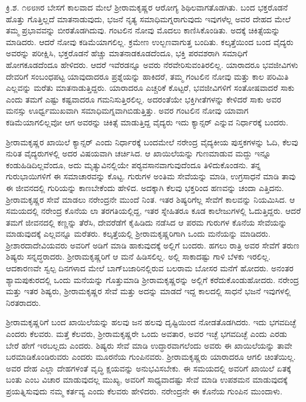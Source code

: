 ಕ್ರಿ.ಶ. ೧೮೮೫ರ ಬೇಸಗೆ ಕಾಲವಾದ ಮೇಲೆ ಶ‍್ರೀರಾಮಕೃಷ್ಣರ ಆರೋಗ್ಯ ಶಿಥಿಲವಾಗತೊಡಗಿತು. ಬಂದ ಭಕ್ತರೊಡನೆ ಹೊತ್ತು ಗೊತ್ತಿಲ್ಲದೆ ಮಾತನಾಡುವುದು, ಭಜನೆ ನೃತ್ಯ ಸಮಾಧಿಮಗ್ನರಾಗುವುದು ಇವುಗಳೆಲ್ಲ ಅವರ ದೇಹದ ಮೇಲೆ ತಮ್ಮ ಪ್ರಭಾವವನ್ನು ಬೀರತೊಡಗಿದುವು. ಗಂಟಲಿನ ನೋವು ಮೊದಲು ಕಾಣಿಸಿಕೊಂಡಿತು. ಅದಕ್ಕೆ ಚಿಕಿತ್ಸೆಯನ್ನು ಮಾಡಿದರು. ಆದರೆ ನೋವು ಕಡಿಮೆಯಾಗಲಿಲ್ಲ. ಕ್ರಮೇಣ ಉಲ್ಬಣವಾಗುತ್ತ ಬಂದಿತು. ಕಲ್ಕತ್ತೆಯಿಂದ ಬಂದ ವೈದ್ಯರು ಅವರನ್ನು ಪರೀಕ್ಷಿಸಿ, ಭಕ್ತರೊಡನೆ ಹೆಚ್ಚು ಮಾತನಾಡಕೂಡದೆಂದೂ, ಭಕ್ತಿ ಪರವಶರಾಗಿ ಸಮಾಧಿಗೆ ಹೋಗಕೂಡದೆಂದೂ ಹೇಳಿದರು. ಆದರೆ ಇವೆರಡನ್ನೂ ಅವರು ನೆರವೇರಿಸುವಂತಿರಲಿಲ್ಲ. ಯಾರಾದರೂ ಭವಜೀವಿಗಳು ದೇವರಿಗೆ ಸಂಬಂಧಪಟ್ಟ ಯಾವುದಾದರೂ ಪ್ರಶ್ನೆಯನ್ನು ಹಾಕಿದರೆ, ತಮ್ಮ ಗಂಟಲಿನ ನೋವು ಮತ್ತು ಕಾಲ ಪರಿಮಿತಿ ಎಲ್ಲವನ್ನು ಮರೆತು ಮಾತನಾಡುತ್ತಿದ್ದರು. ಯಾರಾದರೂ ಎಚ್ಚರಿಕೆ ಕೊಟ್ಟರೆ, ಭವಜೀವಿಗಳಿಗೆ ಸಂತೋಷವಾದರೆ ಸಾಕು ಎಂದು ತಮಗೆ ಎಷ್ಟು ಕಷ್ಟವಾದರೂ ಗಮನಿಸುತ್ತಿರಲಿಲ್ಲ. ಅದರಂತೆಯೇ ಭಕ್ತಿಗೀತೆಗಳನ್ನು ಕೇಳಿದರೆ ಸಾಕು ಅವರ ಮನಸ್ಸು ಊರ್ಧ್ವಮುಖವಾಗಿ ಸಮಾಧಿಮಗ್ನವಾಗಿಬಿಡುತ್ತಿತ್ತು. ಅವರ ಗಂಟಲಿನ ನೋವು ಯಾವಾಗ ಕಡಿಮೆಯಾಗಲಿಲ್ಲವೋ ಆಗ ಅವರನ್ನು ಚಿಕಿತ್ಸೆ ಮಾಡುತ್ತಿದ್ದ ವೈದ್ಯರು ಇದು ಕ್ಯಾನ್ಸರ್ ಎನ್ನುವ ನಿರ್ಧಾರಕ್ಕೆ ಬಂದರು.

ಶ‍್ರೀರಾಮಕೃಷ್ಣರ ಖಾಯಿಲೆ ಕ್ಯಾನ್ಸರ್ ಎಂದು ನಿರ್ಧಾರಕ್ಕೆ ಬಂದಮೇಲೆ ನರೇಂದ್ರ ವೈದ್ಯಕೀಯ ಪುಸ್ತಕಗಳನ್ನು ಓದಿ, ಕೆಲವು ನುರಿತ ವೈದ್ಯರುಗಳಲ್ಲಿ ಅದರ ವಿಷಯವಾಗಿ ಚರ್ಚಿಸಿದ. ಆ ಖಾಯಿಲೆಯನ್ನು ಗುಣಮಾಡುವ ಮದ್ದು ಇನ್ನೂ ಕಂಡುಹಿಡಿದಿಲ್ಲವೆಂದೂ, ಅದು ಮೃತ್ಯುವಿನಲ್ಲಿಯೇ ಪರ‍್ಯವಸಾನವಾಗುವುದೆಂದೂ ತಿಳಿದುಕೊಂಡನು. ತನ್ನ ಗುರುಭಾಯಿಗಳಿಗೆ ಈ ಸಮಾಚಾರವನ್ನು ಕೊಟ್ಟ. ಗುರುಗಳ ಅಂತಿಮ ಸೇವೆಯನ್ನು ಮಾಡಿ, ಉಗ್ರಸಾಧನೆ ಮಾಡಿ ತಾವು ಈ ಜೀವನದಲ್ಲಿ ಗುರಿಯನ್ನು ಕಾಣಬೇಕೆಂದು ಹೇಳಿದ. ಅದಕ್ಕಾಗಿ ಕೆಲವು ಭಕ್ತರಿಂದ ಹಣವನ್ನು ಚಂದಾ ಎತ್ತಿದನು. ಶ‍್ರೀರಾಮಕೃಷ್ಣರ ಸೇವೆ ಮಾಡಲು ನರೇಂದ್ರನೇ ಮುಂದೆ ನಿಂತ. ಇತರ ಶಿಷ್ಯರಿಗೆಲ್ಲ ಸೇವೆಗೆ ಕಾಲವನ್ನು ನಿಯಮಿಸಿದ. ಆ ಸಮಯದಲ್ಲಿ ನರೇಂದ್ರ ಕೊನೆಯ ಲಾ ತರಗತಿಯಲ್ಲಿದ್ದ, ಇತರ ಸ್ನೇಹಿತರೂ ಕೂಡ ಕಾಲೇಜುಗಳಲ್ಲಿ ಓದುತ್ತಿದ್ದರು. ಆದರೆ ತಮಗೆ ಜೀವನದಲ್ಲಿ ಕಣ್ಣನ್ನು ತೆರೆಸಿ, ದೇವರೆಡೆಗೆ ಕೈಹಿಡಿದು ನಡೆಸಿದ ಆ ಪರಮ ಗುರುಗಳ ಕೊನೆಯ ಸೇವೆಯನ್ನು ಮಾಡುವುದಕ್ಕೆ ಎಲ್ಲವನ್ನೂ ಮರೆತರು. ಕಲ್ಕತ್ತೆಯಲ್ಲಿ ಶ‍್ರೀರಾಮಕೃಷ್ಣರಿಗಾಗಿ ಒಂದು ಮನೆಯನ್ನು ಮಾಡಿದರು. ಶ‍್ರೀಶಾರದಾದೇವಿಯವರು ಅವರಿಗೆ ಅಡಿಗೆ ಮಾಡಿ ಹಾಕುವುದಕ್ಕೆ ಅಲ್ಲಿಗೆ ಬಂದರು. ಹಗಲು ರಾತ್ರಿ ಅವರ ಸೇವೆಗೆ ತರುಣ ಶಿಷ್ಯರು ಸನ್ನದ್ಧರಾದರು. ಶ‍್ರೀರಾಮಕೃಷ್ಣರಿಗೆ ಆ ಮನೆ ಹಿಡಿಸಲಿಲ್ಲ. ಅಲ್ಲಿ ಸಾಕಾದಷ್ಟು ಗಾಳಿ ಬೆಳಕು ಇರಲಿಲ್ಲ. ಆದಕಾರಣವೇ ಸ್ವಲ್ಪ ದಿನಗಳಾದ ಮೇಲೆ ಬಾಗ್‍ಬಜಾರಿನಲ್ಲಿರುವ ಬಲರಾಮ ಬೋಸರ ಮನೆಗೆ ಹೋದರು. ಅನಂತರ ಶ್ಯಾಮಪುಕುರದಲ್ಲಿ ಒಂದು ಮನೆಯನ್ನು ಗೊತ್ತುಮಾಡಿ ಶ‍್ರೀರಾಮಕೃಷ್ಣರನ್ನು ಅಲ್ಲಿಗೆ ಕರೆದುಕೊಂಡುಹೋದರು. ನರೇಂದ್ರ ಮತ್ತು ಇತರ ಶಿಷ್ಯರು, ಶ‍್ರೀರಾಮಕೃಷ್ಣರ ಸೇವೆ ಮತ್ತು ಅದನ್ನು ಮಾಡದೆ ಇದ್ದ ಕಾಲದಲ್ಲಿ ಸಾಧನೆ ಭಜನೆ ಇವುಗಳಲ್ಲಿ ನಿರತರಾದರು.

ಶ‍್ರೀರಾಮಕೃಷ್ಣರಿಗೆ ಬಂದ ಖಾಯಿಲೆಯನ್ನು ಹಲವು ಜನ ಹಲವು ದೃಷ್ಟಿಯಿಂದ ನೋಡತೊಡಗಿದರು. ಇದು ಭಗವದಿಚ್ಛೆ ಎಂದರು ಕೆಲವರು. ಮತ್ತೆ ಕೆಲವರು, ಶ‍್ರೀರಾಮಕೃಷ್ಣರೇ ಒಂದು ಅವತಾರ, ಅವರ ಇಚ್ಛೆ ಭಗವದಿಚ್ಛೆ ಎಂದು ಎರಡು ಬೇರೆ ಹೇಗೆ ಇರಬಲ್ಲದು ಎಂದರು. ಶಿಷ್ಯರು ಸೇವೆ ಮಾಡಿ ಉದ್ಧಾರವಾಗಲೆಂದು ಅವರು ಈ ಖಾಯಿಲೆಯನ್ನು ತಾವೇ ಬರಮಾಡಿಕೊಂಡಿರುವರು ಎಂದರು ಮೂರನೆಯ ಗುಂಪಿನವರು. ಶ‍್ರೀರಾಮಕೃಷ್ಣರು ಯಾರಾದರೂ ಆಗಲಿ ಚಿಂತೆಯಿಲ್ಲ. ಅವರ ದೇಹ ಎಲ್ಲಾ ದೇಹಗಳಂತೆ ವೃದ್ಧಿ ಕ್ಷಯವನ್ನು ಅನುಭವಿಸಬೇಕು. ಈ ಸಮಯದಲ್ಲಿ ಅವರಿಗೆ ಖಾಯಿಲೆ ಏತಕ್ಕೆ ಬಂತು ಎಂಬ ವಿಚಾರ ಮಾಡುವುದಲ್ಲ ಮುಖ್ಯ, ಅವರಿಗೆ ಸಾಧ್ಯವಾದಷ್ಟು ಸೇವೆ ಮಾಡಿ ಉಪಶಮನ ಮಾಡುವುದಕ್ಕೆ ಪ್ರಯತ್ನಿಸುವುದು ನಮ್ಮ ಕರ್ತವ್ಯ ಎಂದು ಕೆಲವರು ಹೇಳಿದರು. ನರೇಂದ್ರನೇ ಈ ಕೊನೆಯ ಗುಂಪಿನ ಮುಂದಾಳು.

